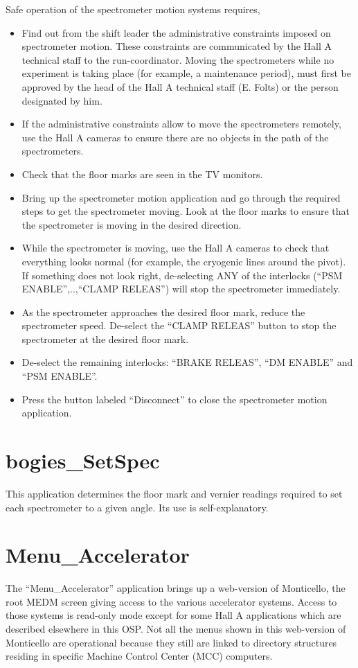 {\begin{safetyen}{30}{10}
Safe operation of the spectrometer motion systems requires,
\begin{itemize}
\item Find out from the shift leader the administrative constraints imposed on
spectrometer motion.
These constraints are communicated by the Hall A technical staff to the run-coordinator.
Moving the spectrometers while no experiment is taking place (for example,
a maintenance period), must first be approved by the head of the Hall A technical
staff (E. Folts) or the person designated by him.
\item If the administrative constraints allow to move the spectrometers remotely,
use the Hall A cameras
to ensure there are no objects in the path of the spectrometers.
\item Check that the floor marks are seen in the TV monitors.
\item Bring up the spectrometer motion application and go through the required steps
to get the spectrometer moving. Look at the floor marks
to ensure that the spectrometer is moving in the desired direction.
\item While the spectrometer is moving, use
the Hall A cameras to check that everything looks normal (for example, the cryogenic lines
around the pivot). If something does not look right, de-selecting ANY of the
interlocks (``PSM ENABLE'',..,``CLAMP RELEAS'') will stop the spectrometer immediately.
\item As the spectrometer approaches the desired floor mark, reduce the spectrometer
speed. De-select the ``CLAMP RELEAS'' button to stop the spectrometer at the desired floor mark.
\item De-select the remaining interlocks: ``BRAKE RELEAS'', ``DM ENABLE'' and ``PSM ENABLE''.
\item Press the button labeled ``Disconnect'' to close the spectrometer motion
application.
\end{itemize}
\end{safetyen}

\section{bogies\_SetSpec}
This application determines the floor mark and vernier readings required
to set each spectrometer to a given angle. Its use is self-explanatory.

\section{Menu\_Accelerator}
The ``Menu\_Accelerator'' application brings up a web-version of Monticello,
the root MEDM screen giving access to the various accelerator systems. Access to those
systems is read-only mode except for some Hall A applications which are described elsewhere
in this OSP. Not all the menus shown in this web-version of Monticello are operational
because they still are linked to directory structures residing in specific
Machine Control Center (MCC) computers.

}
